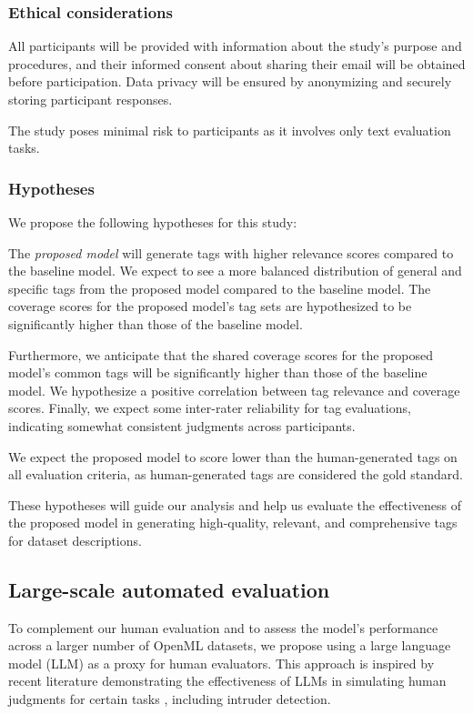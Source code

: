 \subsubsection{Ethical considerations}
All participants will be provided with information about the study's purpose and procedures, and their informed consent about sharing their email will be obtained before participation. Data privacy will be ensured by anonymizing and securely storing participant responses.

The study poses minimal risk to participants as it involves only text evaluation tasks.


\subsubsection{Hypotheses}
We propose the following hypotheses for this study:

The \textit{proposed model} will generate tags with higher relevance scores compared to the baseline model. We expect to see a more balanced distribution of general and specific tags from the proposed model compared to the baseline model. The coverage scores for the proposed model's tag sets are hypothesized to be significantly higher than those of the baseline model.

Furthermore, we anticipate that the shared coverage scores for the proposed model's common tags will be significantly higher than those of the baseline model. We hypothesize a positive correlation between tag relevance and coverage scores. Finally, we expect some inter-rater reliability for tag evaluations, indicating somewhat consistent judgments across participants.

We expect the proposed model to score lower than the human-generated tags on all evaluation criteria, as human-generated tags are considered the gold standard.

These hypotheses will guide our analysis and help us evaluate the effectiveness of the proposed model in generating high-quality, relevant, and comprehensive tags for dataset descriptions.

\subsection{Large-scale automated evaluation}
\label{sec:large_scale_evaluation}

To complement our human evaluation and to assess the model's performance across a larger number of OpenML datasets, we propose using a large language model (LLM) as a proxy for human evaluators. This approach is inspired by recent literature demonstrating the effectiveness of LLMs in simulating human judgments for certain tasks \cite{musil_exploring_2024}, including intruder detection.

